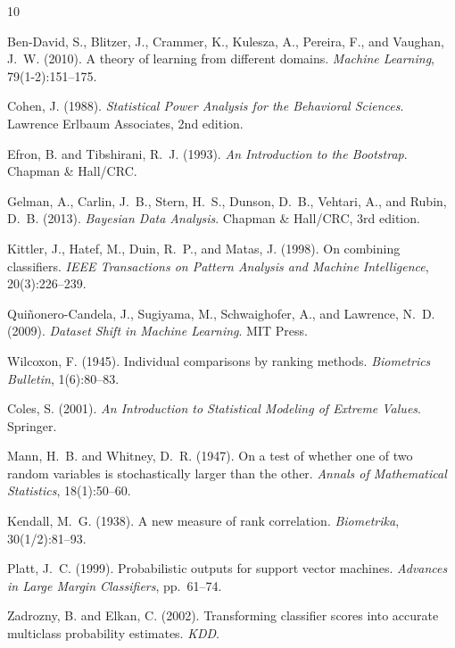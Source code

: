 \documentclass[a4paper,11pt]{article}
\begin{document}
\begin{thebibliography}{10}

Ben-David, S., Blitzer, J., Crammer, K., Kulesza, A., Pereira, F., and Vaughan, J.~W. (2010).
A theory of learning from different domains.
\textit{Machine Learning}, 79(1-2):151--175.

Cohen, J. (1988).
\textit{Statistical Power Analysis for the Behavioral Sciences}.
Lawrence Erlbaum Associates, 2nd edition.

Efron, B. and Tibshirani, R.~J. (1993).
\textit{An Introduction to the Bootstrap}.
Chapman \& Hall/CRC.

Gelman, A., Carlin, J.~B., Stern, H.~S., Dunson, D.~B., Vehtari, A., and Rubin, D.~B. (2013).
\textit{Bayesian Data Analysis}.
Chapman \& Hall/CRC, 3rd edition.

Kittler, J., Hatef, M., Duin, R.~P., and Matas, J. (1998).
On combining classifiers.
\textit{IEEE Transactions on Pattern Analysis and Machine Intelligence}, 20(3):226--239.

Qui{\~n}onero-Candela, J., Sugiyama, M., Schwaighofer, A., and Lawrence, N.~D. (2009).
\textit{Dataset Shift in Machine Learning}.
MIT Press.

Wilcoxon, F. (1945).
Individual comparisons by ranking methods.
\textit{Biometrics Bulletin}, 1(6):80--83.

Coles, S. (2001).
\textit{An Introduction to Statistical Modeling of Extreme Values}.
Springer.

Mann, H.~B. and Whitney, D.~R. (1947).
On a test of whether one of two random variables is stochastically larger than the other.
\textit{Annals of Mathematical Statistics}, 18(1):50--60.

Kendall, M.~G. (1938).
A new measure of rank correlation.
\textit{Biometrika}, 30(1/2):81--93.

Platt, J.~C. (1999).
Probabilistic outputs for support vector machines.
\textit{Advances in Large Margin Classifiers}, pp.~61--74.

Zadrozny, B. and Elkan, C. (2002).
Transforming classifier scores into accurate multiclass probability estimates.
\textit{KDD}.

\end{thebibliography}
\end{document}
